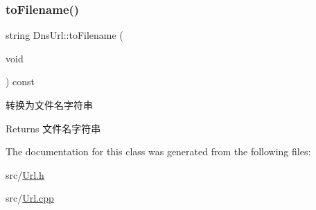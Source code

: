 \subsubsection{\texorpdfstring{to\+Filename()}{toFilename()}}
{\footnotesize\ttfamily string Dns\+Url\+::to\+Filename (\begin{DoxyParamCaption}\item[{void}]{ }\end{DoxyParamCaption}) const}



转换为文件名字符串 

\begin{DoxyReturn}{Returns}
文件名字符串 
\end{DoxyReturn}


The documentation for this class was generated from the following files\+:\begin{DoxyCompactItemize}
\item 
src/\hyperlink{_url_8h}{Url.\+h}\item 
src/\hyperlink{_url_8cpp}{Url.\+cpp}\end{DoxyCompactItemize}
